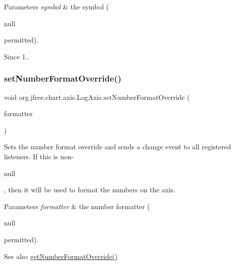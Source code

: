 \begin{DoxyParams}{Parameters}
{\em symbol} & the symbol (
\begin{DoxyCode}
null 
\end{DoxyCode}
 permitted).\\
\hline
\end{DoxyParams}
\begin{DoxySince}{Since}
1.. 
\end{DoxySince}
\mbox{\label{classorg_1_1jfree_1_1chart_1_1axis_1_1_log_axis_a6c15f9a9f7b92544be4244bd4df8622b}} 
\subsubsection{\texorpdfstring{set\+Number\+Format\+Override()}{setNumberFormatOverride()}}
{\footnotesize\ttfamily void org.\+jfree.\+chart.\+axis.\+Log\+Axis.\+set\+Number\+Format\+Override (\begin{DoxyParamCaption}\item[{Number\+Format}]{formatter }\end{DoxyParamCaption})}

Sets the number format override and sends a change event to all registered listeners. If this is non-\/
\begin{DoxyCode}
null 
\end{DoxyCode}
 , then it will be used to format the numbers on the axis.


\begin{DoxyParams}{Parameters}
{\em formatter} & the number formatter (
\begin{DoxyCode}
null 
\end{DoxyCode}
 permitted).\\
\hline
\end{DoxyParams}
\begin{DoxySeeAlso}{See also}
\mbox{\hyperlink{classorg_1_1jfree_1_1chart_1_1axis_1_1_log_axis_abfe91c2add4820043db00e299893f7ed}{get\+Number\+Format\+Override()}} 
\end{DoxySeeAlso}
\mbox{\label{classorg_1_1jfree_1_1chart_1_1axis_1_1_log_axis_a34f8a540ace9cde63733118ccc9d9b48}} 
